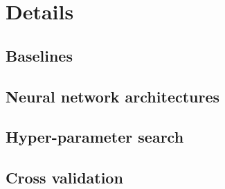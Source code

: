 \section{Details} %
\label{sec:details}



\subsection{Baselines} %
\label{sub:baselines}





\subsection{Neural network architectures} %
\label{sub:neural_network_architectures}





\subsection{Hyper-parameter search} %
\label{sub:hyper_parameter_search}






\subsection{Cross validation} %
\label{sub:cross_validation}








